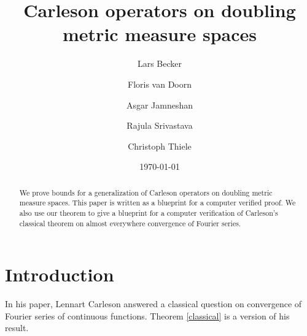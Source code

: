 
\title{Carleson operators on doubling metric measure spaces}

\author{Lars Becker \and Floris van Doorn \and Asgar Jamneshan \and Rajula Srivastava \and Christoph Thiele}

\date{\today}

\begin{abstract}
We prove  bounds for a generalization of Carleson operators on doubling metric measure spaces.
This paper is written as a blueprint for a computer verified proof. We also use our theorem to give a blueprint for a computer verification of Carleson's classical theorem on almost everywhere convergence of Fourier series.
\end{abstract}

\maketitle

\tableofcontents

\chapter{Introduction}

In his \cite{carleson} paper, Lennart Carleson
answered a classical question on convergence of
Fourier series of continuous functions. Theorem
\ref{classical} is a version of his result.

